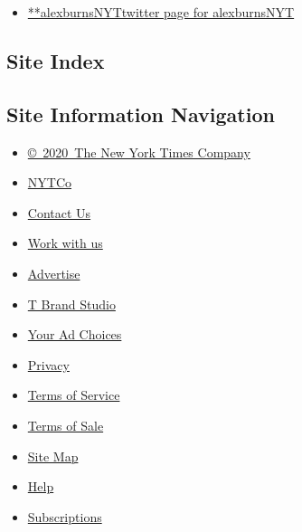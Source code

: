 \begin{itemize}
\tightlist
\item
  \href{https://twitter.com/alexburnsNYT}{**alexburnsNYTtwitter page for
  alexburnsNYT}
\end{itemize}

\hypertarget{site-index}{%
\subsection{Site Index}\label{site-index}}

\hypertarget{site-information-navigation}{%
\subsection{Site Information
Navigation}\label{site-information-navigation}}

\begin{itemize}
\tightlist
\item
  \href{https://help.nytimes.com/hc/en-us/articles/115014792127-Copyright-notice}{©~2020~The
  New York Times Company}
\end{itemize}

\begin{itemize}
\tightlist
\item
  \href{https://www.nytco.com/}{NYTCo}
\item
  \href{https://help.nytimes.com/hc/en-us/articles/115015385887-Contact-Us}{Contact
  Us}
\item
  \href{https://www.nytco.com/careers/}{Work with us}
\item
  \href{https://nytmediakit.com/}{Advertise}
\item
  \href{http://www.tbrandstudio.com/}{T Brand Studio}
\item
  \href{https://www.nytimes.com/privacy/cookie-policy\#how-do-i-manage-trackers}{Your
  Ad Choices}
\item
  \href{https://www.nytimes.com/privacy}{Privacy}
\item
  \href{https://help.nytimes.com/hc/en-us/articles/115014893428-Terms-of-service}{Terms
  of Service}
\item
  \href{https://help.nytimes.com/hc/en-us/articles/115014893968-Terms-of-sale}{Terms
  of Sale}
\item
  \href{https://spiderbites.nytimes.com}{Site Map}
\item
  \href{https://help.nytimes.com/hc/en-us}{Help}
\item
  \href{https://www.nytimes.com/subscription?campaignId=37WXW}{Subscriptions}
\end{itemize}
